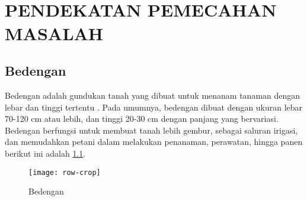 
\chapter[PENDEKATAN PEMECAHAN MASALAH]{\\ PENDEKATAN PEMECAHAN MASALAH}

\section{Bedengan}
Bedengan adalah gundukan tanah yang dibuat untuk menanam tanaman dengan lebar dan tinggi tertentu \cite{kurniawan2024pengaruh}. Pada umumnya, bedengan dibuat dengan ukuran lebar 70-120 cm atau lebih, dan tinggi 20-30 cm dengan panjang yang bervariasi. Bedengan berfungsi untuk membuat tanah lebih gembur, sebagai saluran irigasi, dan memudahkan petani dalam melakukan penanaman, perawatan, hingga panen \cite{hariatimodifikasi} berikut ini adalah \cref{fig:bedengan}. 
\begin{figure}[H]
	\centering
	\texttt{[image: row-crop]}
	\caption{Bedengan}
	\label{fig:bedengan}
\end{figure}

